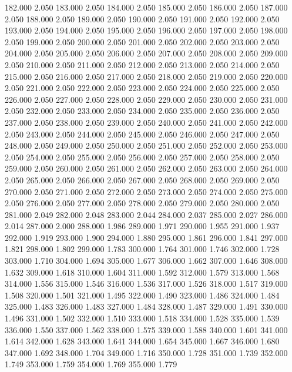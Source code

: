182.000 2.050 
183.000 2.050 
184.000 2.050 
185.000 2.050 
186.000 2.050 
187.000 2.050 
188.000 2.050 
189.000 2.050 
190.000 2.050 
191.000 2.050 
192.000 2.050 
193.000 2.050 
194.000 2.050 
195.000 2.050 
196.000 2.050 
197.000 2.050 
198.000 2.050 
199.000 2.050 
200.000 2.050 
201.000 2.050 
202.000 2.050 
203.000 2.050 
204.000 2.050 
205.000 2.050 
206.000 2.050 
207.000 2.050 
208.000 2.050 
209.000 2.050 
210.000 2.050 
211.000 2.050 
212.000 2.050 
213.000 2.050 
214.000 2.050 
215.000 2.050 
216.000 2.050 
217.000 2.050 
218.000 2.050 
219.000 2.050 
220.000 2.050 
221.000 2.050 
222.000 2.050 
223.000 2.050 
224.000 2.050 
225.000 2.050 
226.000 2.050 
227.000 2.050 
228.000 2.050 
229.000 2.050 
230.000 2.050 
231.000 2.050 
232.000 2.050 
233.000 2.050 
234.000 2.050 
235.000 2.050 
236.000 2.050 
237.000 2.050 
238.000 2.050 
239.000 2.050 
240.000 2.050 
241.000 2.050 
242.000 2.050 
243.000 2.050 
244.000 2.050 
245.000 2.050 
246.000 2.050 
247.000 2.050 
248.000 2.050 
249.000 2.050 
250.000 2.050 
251.000 2.050 
252.000 2.050 
253.000 2.050 
254.000 2.050 
255.000 2.050 
256.000 2.050 
257.000 2.050 
258.000 2.050 
259.000 2.050 
260.000 2.050 
261.000 2.050 
262.000 2.050 
263.000 2.050 
264.000 2.050 
265.000 2.050 
266.000 2.050 
267.000 2.050 
268.000 2.050 
269.000 2.050 
270.000 2.050 
271.000 2.050 
272.000 2.050 
273.000 2.050 
274.000 2.050 
275.000 2.050 
276.000 2.050 
277.000 2.050 
278.000 2.050 
279.000 2.050 
280.000 2.050 
281.000 2.049 
282.000 2.048 
283.000 2.044 
284.000 2.037 
285.000 2.027 
286.000 2.014 
287.000 2.000 
288.000 1.986 
289.000 1.971 
290.000 1.955 
291.000 1.937 
292.000 1.919 
293.000 1.900 
294.000 1.880 
295.000 1.861 
296.000 1.841 
297.000 1.821 
298.000 1.802 
299.000 1.783 
300.000 1.764 
301.000 1.746 
302.000 1.728 
303.000 1.710 
304.000 1.694 
305.000 1.677 
306.000 1.662 
307.000 1.646 
308.000 1.632 
309.000 1.618 
310.000 1.604 
311.000 1.592 
312.000 1.579 
313.000 1.568 
314.000 1.556 
315.000 1.546 
316.000 1.536 
317.000 1.526 
318.000 1.517 
319.000 1.508 
320.000 1.501 
321.000 1.495 
322.000 1.490 
323.000 1.486 
324.000 1.484 
325.000 1.483 
326.000 1.483 
327.000 1.484 
328.000 1.487 
329.000 1.491 
330.000 1.496 
331.000 1.502 
332.000 1.510 
333.000 1.518 
334.000 1.528 
335.000 1.539 
336.000 1.550 
337.000 1.562 
338.000 1.575 
339.000 1.588 
340.000 1.601 
341.000 1.614 
342.000 1.628 
343.000 1.641 
344.000 1.654 
345.000 1.667 
346.000 1.680 
347.000 1.692 
348.000 1.704 
349.000 1.716 
350.000 1.728 
351.000 1.739 
352.000 1.749 
353.000 1.759 
354.000 1.769 
355.000 1.779 
